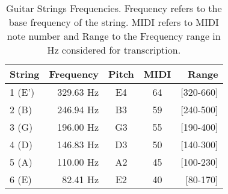 \begin{table}[ht!]
\centering
  \caption[Guitar Strings Frequencies.]{Guitar Strings Frequencies. Frequency refers to the base frequency of the string. MIDI refers to MIDI note number and Range to the Frequency range in Hz considered for transcription.}
  \label{tab:guitar_strings}
  \begin{tabular}{  l r c c r }
    \hline
	String & Frequency & Pitch & MIDI & Range\\ \hline
    1 (E') & 329.63 Hz & E4 & 64 & [320-660]\\ 
    2 (B) & 246.94 Hz & B3 & 59 & [240-500]\\
    3 (G) & 196.00 Hz & G3 & 55 & [190-400]\\
    4 (D) & 146.83 Hz & D3 & 50 & [140-300]\\
    5 (A) & 110.00 Hz & A2 & 45 & [100-230]\\
    6 (E) & 82.41 Hz & E2 & 40 & [80-170]\\
    \hline
  \end{tabular}

\end{table}
